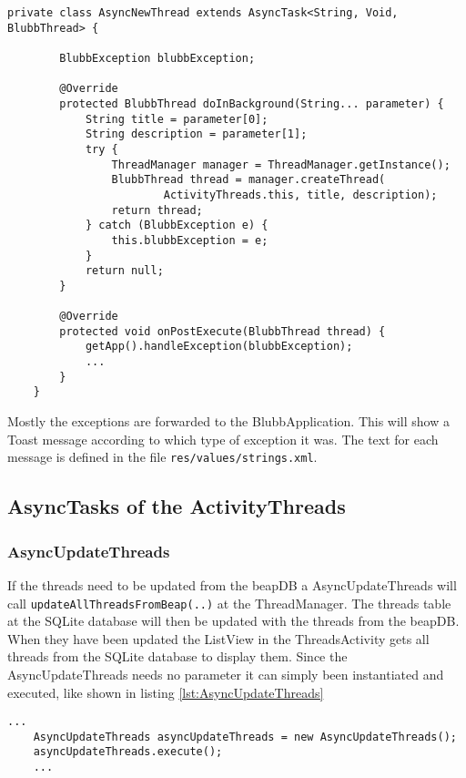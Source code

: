 \documentclass[12pt,a4paper,oneside]{report}
\newcommand{\code}[1]{\lstinline{#1}}
\begin{document}
\begin{lstlisting}[caption=Exception handling in AsyncTasks, label=lst:Exception]
private class AsyncNewThread extends AsyncTask<String, Void, BlubbThread> {
        
        BlubbException blubbException;

        @Override
        protected BlubbThread doInBackground(String... parameter) {
            String title = parameter[0];
            String description = parameter[1];
            try {
            	ThreadManager manager = ThreadManager.getInstance();
            	BlubbThread thread = manager.createThread(
                        ActivityThreads.this, title, description);
                return thread;
            } catch (BlubbException e) {
                this.blubbException = e;
            }
            return null;
        }
        
        @Override
        protected void onPostExecute(BlubbThread thread) {
            getApp().handleException(blubbException);
        	...
        }
	}
\end{lstlisting}
Mostly the exceptions are forwarded to the BlubbApplication. This will show a Toast message according to which type of exception it was. The text for each message is defined in the file \code{res/values/strings.xml}.

\subsection{AsyncTasks of the ActivityThreads}

\subsubsection{AsyncUpdateThreads}
\label{AsyncUpdateThreads}

If the threads need to be updated from the beapDB a AsyncUpdateThreads will call \code{updateAllThreadsFromBeap(..)} at the ThreadManager. The threads table at the SQLite database will then be updated with the threads from the beapDB. When they have been updated the ListView in the ThreadsActivity gets all threads from the SQLite database to display them.
Since the AsyncUpdateThreads needs no parameter it can simply been instantiated and executed, like shown in listing \ref{lst:AsyncUpdateThreads}

\begin{lstlisting}[caption=AsyncUpdateThreads, label=lst:AsyncUpdateThreads]
	...
	AsyncUpdateThreads asyncUpdateThreads = new AsyncUpdateThreads();
	asyncUpdateThreads.execute();
	...
\end{lstlisting}
\end{document}
